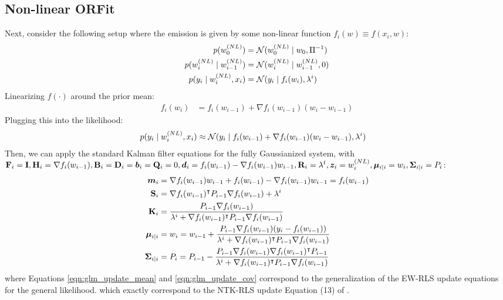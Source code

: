 \subsection{Non-linear ORFit}
\label{sec:nl_orfit}
Next, consider the following setup where the emission is given by some non-linear function $f_i(w) \equiv f(x_i, w)$:
\begin{align}
    p(w_0^{(NL)}) &= \mathcal{N}(w_0^{(NL)} \mid w_0, \Pi^{-1}) \\
    p(w_i^{(NL)} \mid w_{i-1}^{(NL)}) &= \mathcal{N}(w_i^{(NL)} \mid w_{i-1}^{(NL)}, 0) \\
    p(y_i \mid w_i^{(NL)}, x_i) &= \mathcal{N}(y_i \mid f_i(w_i), \lambda^{i})
\end{align}
Linearizing $f(\cdot)$ around the prior mean:
\begin{align}
    f_i(w_i) &= f_i(w_{i-1}) + \nabla f_i(w_{i-1}) (w_i - w_{i-1})
\end{align}
Plugging this into the likelihood:
\begin{align}
    p(y_i \mid w_i^{(NL)}, x_i) &\approx \mathcal{N}(y_i \mid f_i(w_{i-1}) + \nabla f_i(w_{i-1}) (w_i - w_{i-1}), \lambda^{i})
\end{align}
Then, we can apply the standard Kalman filter equations for the fully Gaussianized system, 
with $\mathbf{F}_i = \mathbf{I}, \mathbf{H}_i = \nabla f_i(w_{i-1}), \mathbf{B}_i = \mathbf{D}_i = {\bm{b}}_i = \mathbf{Q}_i = 0, 
{\bm{d}}_i = f_i(w_{i-1}) - \nabla f_i(w_{i-1}) w_{i-1}, \mathbf{R}_i = \lambda^{t},
{\bm{z}}_i = w_i^{(NL)}, \boldsymbol{\mu}_{i|i} = w_i, \boldsymbol{\Sigma}_{i|i} = P_{i}$:
\begin{align}
    {\bm{m}}_i &= \nabla f_i(w_{i-1}) w_{i-1} + f_i(w_{i-1}) - \nabla f_i(w_{i-1})w_{i-1} = f_i(w_{i-1}) \\
    \mathbf{S}_i &= \nabla f_i(w_{i-1})^{\intercal} P_{i-1} \nabla f_i(w_{i-1}) + \lambda^{i} \\
    \mathbf{K}_i &= \frac{P_{i-1} \nabla f_i(w_{i-1})}{\lambda^{i}
    + \nabla f_i(w_{i-1})^{\intercal} P_{i-1} \nabla f_i(w_{i-1})} \\
    \boldsymbol{\mu}_{i|i} &= w_{i} = w_{i-1} + 
    \frac{P_{i-1} \nabla f_i(w_{i-1}) (y_i - f_i(w_{i-1}))}{\lambda^{i}
    + \nabla f_i(w_{i-1})^{\intercal} P_{i-1} \nabla f_i(w_{i-1})} \label{eqn:nl_update_mean} \\
    \boldsymbol{\Sigma}_{i|i} &= P_{i} = P_{i-1} - 
    \frac{P_{i-1} \nabla f_i(w_{i-1}) \nabla f_i(w_{i-1})^{\intercal} P_{i-1}}{\lambda^{i}
    + \nabla f_i(w_{i-1})^{\intercal} P_{i-1} \nabla f_i(w_{i-1})} \label{eqn:nl_update_cov}
\end{align}
where Equations \ref{eqn:glm_update_mean} and \ref{eqn:glm_update_cov} correspond to the generalization
of the EW-RLS update equations for the general likelihood.
which exactly correspond to the NTK-RLS update
Equation (13) of \cite{ORFit}.

